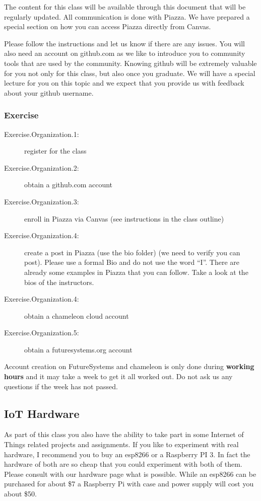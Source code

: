 The content for this class will be available through this document
that will be regularly updated. All communication is done with
Piazza. We have prepared a special section on how you can access
Piazza directly from Canvas.

Please follow the instructions and let us know if there are any issues.
You will also need an account on github.com as we like to introduce you
to community tools that are used by the community. Knowing github will
be extremely valuable for you not only for this class, but also once you
graduate. We will have a special lecture for you on this topic and we
expect that you provide us with feedback about your github username.

\subsubsection{Exercise}

\begin{description}
\item[Exercise.Organization.1:] register for the class
\item[Exercise.Organization.2:] obtain a github.com account
\item[Exercise.Organization.3:] enroll in Piazza via Canvas (see
  instructions in the class outline)
\item[Exercise.Organization.4:] create a post in Piazza (use the bio
  folder) (we need to verify you can post). Please use a formal Bio
  and do not use the word ``I''. There are already some examples in
  Piazza that you can follow. Take a look at the bios of the
  instructors.
\item[Exercise.Organization.4:] obtain a chameleon cloud account
\item[Exercise.Organization.5:] obtain a futuresystems.org account
\end{description}

Account creation on FutureSystems and chameleon is only done during
\textbf{working hours} and it may take  a week to get it all worked
out. Do not ask us any questions if the week has not passed.

\subsection{IoT Hardware}

As part of this class you also have the ability to take part in some
Internet of Things related projects and assignments. If you like to
experiment with real hardware, I recommend you to buy an esp8266 or a
Raspberry PI 3. In fact the hardware of both are so cheap that you could
experiment with both of them. Please consult with our hardware page what
is possible. While an esp8266 can be purchased for about \$7 a Raspberry
Pi with case and power supply will cost you about \$50.

